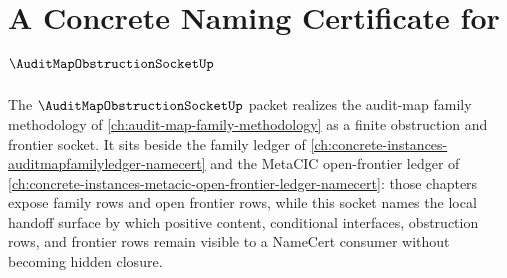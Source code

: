 \chapter{A Concrete Naming Certificate for $\AuditMapObstructionSocketUp$}
\label{ch:concrete-instances-audit-map-obstruction-socket-namecert}

The $\AuditMapObstructionSocketUp$ packet realizes the audit-map family methodology of \autoref{ch:audit-map-family-methodology} as a finite obstruction and frontier socket. It sits beside the family ledger of \autoref{ch:concrete-instances-auditmapfamilyledger-namecert} and the MetaCIC open-frontier ledger of \autoref{ch:concrete-instances-metacic-open-frontier-ledger-namecert}: those chapters expose family rows and open frontier rows, while this socket names the local handoff surface by which positive content, conditional interfaces, obstruction rows, and frontier rows remain visible to a NameCert consumer without becoming hidden closure.

